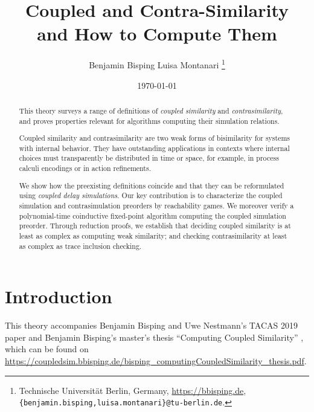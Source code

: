 \documentclass[10pt,a4paper]{article}
\title{ \textbf{Coupled and Contra-Similarity} \\ \Large and How to Compute Them }
\author{ Benjamin Bisping \qquad Luisa Montanari%
  \footnote{Technische Universit\"at Berlin, Germany,
    \url{https://bbisping.de}, \texttt{\{benjamin.bisping,luisa.montanari\}@tu-berlin.de}.} }
\date{\today}
\begin{document}
\maketitle

\begin{abstract}
\noindent
This theory surveys a range of definitions of \emph{coupled similarity} and \emph{contrasimilarity},
and proves properties relevant for algorithms computing their simulation relations.

Coupled similarity and contrasimilarity are two weak forms of bisimilarity for systems with
internal behavior.
They have outstanding applications in contexts where internal choices must transparently be
distributed in time or space, for example, in process calculi encodings or in action refinements.

We show how the preexisting definitions coincide and that they can be reformulated using
\emph{coupled delay simulations}. Our key contribution is to characterize the
coupled simulation and contrasimulation preorders by reachability games. We moreover verify a
polynomial-time coinductive fixed-point algorithm computing the coupled simulation preorder.
Through reduction proofs, we establish that deciding coupled similarity is at least as complex
as computing weak similarity; and checking contrasimilarity at least as complex as trace inclusion
checking.
\end{abstract}

\tableofcontents

\section{Introduction}

\cite{bm2021contrasimilarity}

This theory accompanies Benjamin Bisping and Uwe Nestmann's TACAS 2019 paper \cite{bn2019coupledsimTacas}
and Benjamin Bisping's master's thesis ``Computing Coupled Similarity'' \cite{bisping2018coupledsim},
which can be found on \url{https://coupledsim.bbisping.de/bisping_computingCoupledSimilarity_thesis.pdf}.





{}


\end{document}
